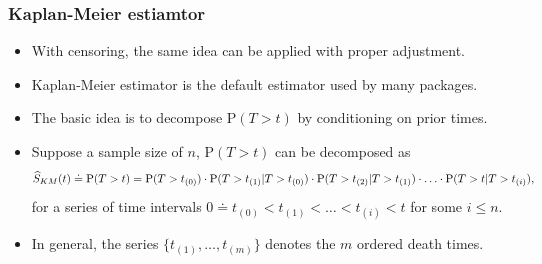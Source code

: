 \documentclass[10pt]{beamer}\usepackage[]{graphicx}\usepackage[]{color}
\newcommand{\p}{\mathrm{P}}
\newcommand{\Skm}{\widehat{S}_{\scriptsize{KM}}}
\begin{document}
\begin{frame}[fragile]
  \frametitle{Kaplan-Meier estiamtor}
  \begin{itemize}
  \item With censoring, the same idea can be applied with proper adjustment.
  \item Kaplan-Meier estimator is the default estimator used by many packages. 
  \item The basic idea is to decompose $\p(T > t)$ by conditioning on prior times.
  \item Suppose a sample size of $n$, $\p(T>t)$ can be decomposed as
    {\scriptsize
    \begin{equation*}
      \Skm(t) \doteq   \p(T > t) = 
      \p(T > t_{(0)}) \cdot \p(T > t_{(1)} | T > t_{(0)}) \cdot \p(T > t_{(2)} | T > t_{(1)}) 
      \cdot\ldots\cdot \p(T > t | T > t_{(i)}),
    \end{equation*}}
    for a series of time intervals $0 \doteq  t_{(0)} < t_{(1)} < \ldots < t_{(i)} < t$ for some $i\le n$.
  \item In general, the series $\{t_{(1)}, \ldots, t_{(m)}\}$ 
    denotes the $m$ ordered death times.
  \end{itemize}
\end{frame}
\end{document}
